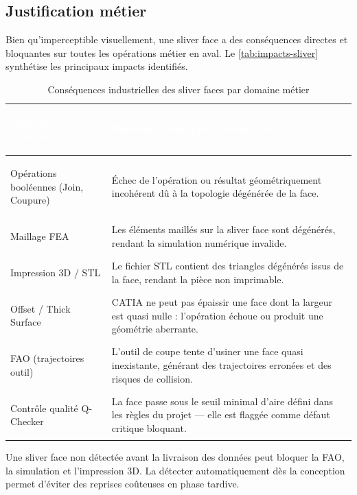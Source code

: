 \subsection{Justification métier}

Bien qu'imperceptible visuellement, une sliver face a des conséquences directes et bloquantes sur toutes les opérations métier en aval. Le \autoref{tab:impacts-sliver} synthétise les principaux impacts identifiés.

\begin{table}[H]
    \centering
    \caption{Conséquences industrielles des sliver faces par domaine métier}
    \label{tab:impacts-sliver}
    \begin{tabularx}{\textwidth}{|>{\bfseries\raggedright\arraybackslash}p{3.8cm}|X|}
        \hline
        \rowcolor{headerblue}
        \textcolor{white}{\textbf{Opération impactée}} & \centering\textcolor{white}{\textbf{Problème causé par la sliver face}} \tabularnewline
        \hline
        \rowcolor{rowlight}
        Opérations booléennes (Join, Coupure) & Échec de l'opération ou résultat géométriquement incohérent dû à la topologie dégénérée de la face. \\
        \hline
        \rowcolor{rowwhite}
        Maillage FEA & Les éléments maillés sur la sliver face sont dégénérés, rendant la simulation numérique invalide. \\
        \hline
        \rowcolor{rowlight}
        Impression 3D / STL & Le fichier STL contient des triangles dégénérés issus de la face, rendant la pièce non imprimable. \\
        \hline
        \rowcolor{rowwhite}
        Offset / Thick Surface & CATIA ne peut pas épaissir une face dont la largeur est quasi nulle : l'opération échoue ou produit une géométrie aberrante. \\
        \hline
        \rowcolor{rowlight}
        FAO (trajectoires outil) & L'outil de coupe tente d'usiner une face quasi inexistante, générant des trajectoires erronées et des risques de collision. \\
        \hline
        \rowcolor{rowwhite}
        Contrôle qualité Q-Checker & La face passe sous le seuil minimal d'aire défini dans les règles du projet --- elle est flaggée comme défaut critique bloquant. \\
        \hline
    \end{tabularx}
\end{table}

\begin{block}[note]
Une sliver face non détectée avant la livraison des données peut bloquer la FAO, la simulation et l'impression 3D. La détecter automatiquement dès la conception permet d'éviter des reprises coûteuses en phase tardive.
\end{block}

